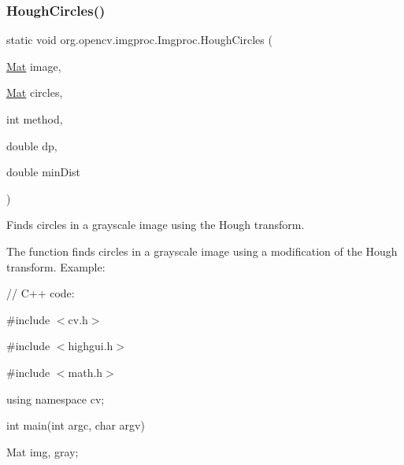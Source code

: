 \subsubsection{\texorpdfstring{Hough\+Circles()}{HoughCircles()}\hspace{0.1cm}{\footnotesize\ttfamily [2/2]}}
{\footnotesize\ttfamily static void org.\+opencv.\+imgproc.\+Imgproc.\+Hough\+Circles (\begin{DoxyParamCaption}\item[{\mbox{\hyperlink{classorg_1_1opencv_1_1core_1_1_mat}{Mat}}}]{image,  }\item[{\mbox{\hyperlink{classorg_1_1opencv_1_1core_1_1_mat}{Mat}}}]{circles,  }\item[{int}]{method,  }\item[{double}]{dp,  }\item[{double}]{min\+Dist }\end{DoxyParamCaption})\hspace{0.3cm}{\ttfamily [static]}}

Finds circles in a grayscale image using the Hough transform.

The function finds circles in a grayscale image using a modification of the Hough transform. Example\+: {\ttfamily }

{\ttfamily }

{\ttfamily }

{\ttfamily // C++ code\+:}

{\ttfamily }

{\ttfamily }

{\ttfamily \#include $<$cv.\+h$>$}

{\ttfamily }

{\ttfamily }

{\ttfamily \#include $<$highgui.\+h$>$}

{\ttfamily }

{\ttfamily }

{\ttfamily \#include $<$math.\+h$>$}

{\ttfamily }

{\ttfamily }

{\ttfamily using namespace cv;}

{\ttfamily }

{\ttfamily }

{\ttfamily int main(int argc, char argv)}

{\ttfamily }

{\ttfamily }

{\ttfamily Mat img, gray;}


